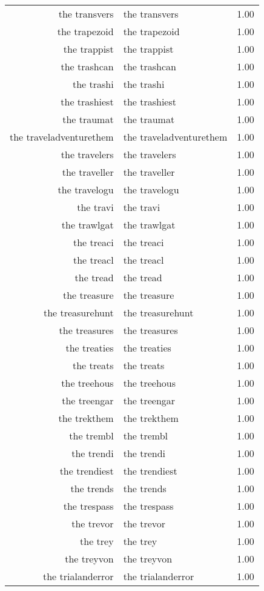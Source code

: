 \begin{table}[ht]
\begin{tabular}{rlr}
  the transvers & the transvers & 1.00 \\ 
  the trapezoid & the trapezoid & 1.00 \\ 
  the trappist & the trappist & 1.00 \\ 
  the trashcan & the trashcan & 1.00 \\ 
  the trashi & the trashi & 1.00 \\ 
  the trashiest & the trashiest & 1.00 \\ 
  the traumat & the traumat & 1.00 \\ 
  the traveladventurethem & the traveladventurethem & 1.00 \\ 
  the travelers & the travelers & 1.00 \\ 
  the traveller & the traveller & 1.00 \\ 
  the travelogu & the travelogu & 1.00 \\ 
  the travi & the travi & 1.00 \\ 
  the trawlgat & the trawlgat & 1.00 \\ 
  the treaci & the treaci & 1.00 \\ 
  the treacl & the treacl & 1.00 \\ 
  the tread & the tread & 1.00 \\ 
  the treasure & the treasure & 1.00 \\ 
  the treasurehunt & the treasurehunt & 1.00 \\ 
  the treasures & the treasures & 1.00 \\ 
  the treaties & the treaties & 1.00 \\ 
  the treats & the treats & 1.00 \\ 
  the treehous & the treehous & 1.00 \\ 
  the treengar & the treengar & 1.00 \\ 
  the trekthem & the trekthem & 1.00 \\ 
  the trembl & the trembl & 1.00 \\ 
  the trendi & the trendi & 1.00 \\ 
  the trendiest & the trendiest & 1.00 \\ 
  the trends & the trends & 1.00 \\ 
  the trespass & the trespass & 1.00 \\ 
  the trevor & the trevor & 1.00 \\ 
  the trey & the trey & 1.00 \\ 
  the treyvon & the treyvon & 1.00 \\ 
  the trialanderror & the trialanderror & 1.00 \\ 

\end{tabular}
\end{table}
